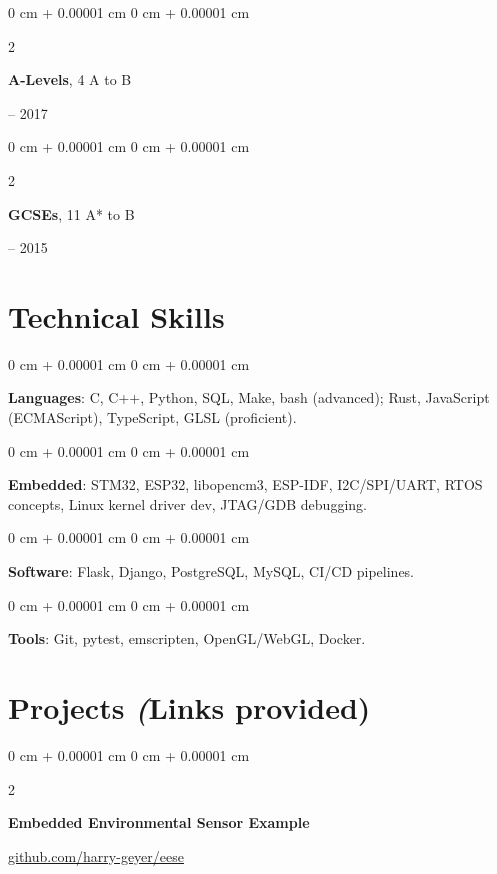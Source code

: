 \documentclass[10pt, letterpaper]{article}
\newenvironment{onecolentry}{
    \begin{adjustwidth}{
        0 cm + 0.00001 cm
    }{
        0 cm + 0.00001 cm
    }
}{
    \end{adjustwidth}
}
\newenvironment{twocolentry}[2][]{
    \onecolentry
    \def\secondColumn{#2}
    \setcolumnwidth{\fill, 4.5 cm}
    \begin{paracol}{2}
}{
    \switchcolumn \raggedleft \secondColumn
    \end{paracol}
    \endonecolentry
}
\begin{document}
        \begin{twocolentry}{
            2015 – 2017
        }
            \textbf{A-Levels}, 4 A to B
        \end{twocolentry}

        \begin{twocolentry}{
            2010 – 2015
        }
            \textbf{GCSEs}, 11 A* to B
        \end{twocolentry}


    \section{Technical Skills}

        \begin{onecolentry}
            \textbf{Languages}: C, C++, Python, SQL, Make, bash (advanced); Rust, JavaScript (ECMAScript), TypeScript, GLSL (proficient).
        \end{onecolentry}

        \vspace{0.2 cm}

        \begin{onecolentry}
            \textbf{Embedded}: STM32, ESP32, libopencm3, ESP-IDF, I2C/SPI/UART, RTOS concepts, Linux kernel driver dev, JTAG/GDB debugging.
        \end{onecolentry}

        \vspace{0.2 cm}

        \begin{onecolentry}
            \textbf{Software}: Flask, Django, PostgreSQL, MySQL, CI/CD pipelines.
        \end{onecolentry}

        \vspace{0.2 cm}

        \begin{onecolentry}
            \textbf{Tools}: Git, pytest, emscripten, OpenGL/WebGL, Docker.
        \end{onecolentry}


    \section{Projects \textit(Links provided)}

        \begin{twocolentry}{\href{https://github.com/harry-geyer/eese}{github.com/harry-geyer/eese}}
            \textbf{Embedded Environmental Sensor Example}
        \end{twocolentry}
\end{document}

